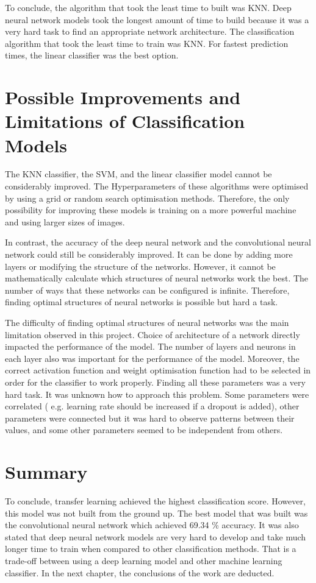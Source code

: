 To conclude, the algorithm that took the least time to built was KNN. Deep neural network models took the longest amount of time to build because it was a very hard task to find an appropriate network architecture. The classification algorithm that took the least time to train was KNN. For fastest prediction times, the linear classifier was the best option.

\section{Possible Improvements and Limitations of Classification Models}

The KNN classifier, the SVM,  and the linear classifier model cannot be considerably improved. The Hyperparameters of these algorithms were optimised by using a grid or random search optimisation methods. Therefore, the only possibility for improving these models is training on a more powerful machine and using  larger sizes of images.

In contrast,  the accuracy of the deep neural network and the convolutional neural network could still be considerably improved. It can be done by adding more layers or modifying the structure of the networks. However, it cannot be mathematically calculate which structures of neural networks work the best. The number of ways that these networks can be configured is infinite. Therefore, finding optimal structures of neural networks is possible but hard a task.

The difficulty of finding optimal structures of neural networks was the main limitation observed in this project. Choice of architecture of a network directly impacted the performance of the model. The number of layers and neurons in each layer also was important for the performance of the model. Moreover, the correct activation function and weight optimisation function had to be selected in order for the classifier to work properly. Finding all these parameters was a very hard task. It was unknown how to approach this problem. Some parameters were correlated ( e.g. learning rate should be increased if a dropout is added), other parameters were connected but it was hard to observe patterns between their values, and some other parameters seemed to be independent from others. 

\section{Summary}

To conclude, transfer learning achieved the highest classification score. However, this model was not built from the ground up. The best model that was built was the convolutional neural network which achieved 69.34 \% accuracy.  It was also stated that deep neural network models are very hard to develop and take much longer time to train when compared to other classification methods. That is a trade-off between using a deep learning model and other machine learning classifier. In the next chapter, the conclusions of the work are deducted.
